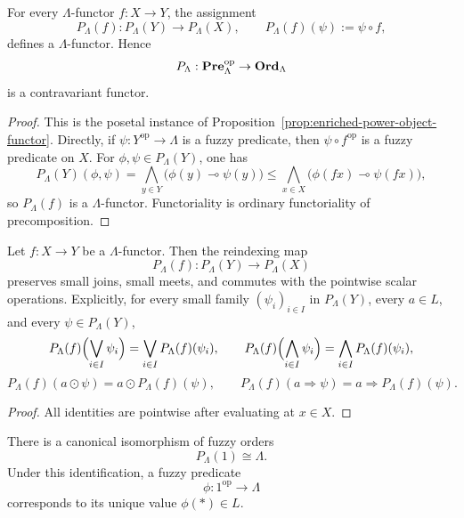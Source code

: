 \begin{proposition}
\label{prop:fuzzy-power-object-functor}
    For every \(\Lambda\)-functor \(f:X\to Y\), the assignment
    \[
        P_\Lambda(f):P_\Lambda(Y)\to P_\Lambda(X),
        \qquad
        P_\Lambda(f)(\psi):=\psi\circ f,
    \]
    defines a \(\Lambda\)-functor. Hence
    \[
        P_\Lambda:\mathbf{Pre}_\Lambda^{\mathrm{op}}\to \mathbf{Ord}_\Lambda
    \]
    is a contravariant functor.
\end{proposition}

\begin{proof}
    This is the posetal instance of Proposition~\ref{prop:enriched-power-object-functor}. Directly, if \(\psi:Y^{\mathrm{op}}\to\Lambda\) is a fuzzy predicate, then \(\psi\circ f^{\mathrm{op}}\) is a fuzzy predicate on \(X\). For \(\phi,\psi\in P_\Lambda(Y)\), one has
    \[
        P_\Lambda(Y)(\phi,\psi)
        =
        \bigwedge_{y\in Y}\bigl(\phi(y)\multimap \psi(y)\bigr)
        \leq
        \bigwedge_{x\in X}
        \bigl(\phi(fx)\multimap \psi(fx)\bigr),
    \]
    so \(P_\Lambda(f)\) is a \(\Lambda\)-functor. Functoriality is ordinary functoriality of precomposition.
\end{proof}

\begin{proposition}
\label{prop:reindexing-preserves-predicate-structure}
    Let \(f:X\to Y\) be a \(\Lambda\)-functor. Then the reindexing map
    \[
        P_\Lambda(f):P_\Lambda(Y)\to P_\Lambda(X)
    \]
    preserves small joins, small meets, and commutes with the pointwise scalar operations. Explicitly, for every small family \((\psi_i)_{i\in I}\) in \(P_\Lambda(Y)\), every \(a\in L\), and every \(\psi\in P_\Lambda(Y)\),
    \[
        P_\Lambda(f)\Bigl(\bigvee_{i\in I}\psi_i\Bigr)
        =
        \bigvee_{i\in I}P_\Lambda(f)(\psi_i),
        \qquad
        P_\Lambda(f)\Bigl(\bigwedge_{i\in I}\psi_i\Bigr)
        =
        \bigwedge_{i\in I}P_\Lambda(f)(\psi_i),
    \]
    \[
        P_\Lambda(f)(a\odot\psi)=a\odot P_\Lambda(f)(\psi),
        \qquad
        P_\Lambda(f)(a\Rightarrow\psi)=a\Rightarrow P_\Lambda(f)(\psi).
    \]
\end{proposition}

\begin{proof}
    All identities are pointwise after evaluating at \(x\in X\).
\end{proof}

\begin{proposition}
\label{prop:power-of-unit}
    There is a canonical isomorphism of fuzzy orders
    \[
        P_\Lambda(1)\cong \Lambda.
    \]
    Under this identification, a fuzzy predicate
    \[
        \phi:1^{\mathrm{op}}\to\Lambda
    \]
    corresponds to its unique value \(\phi(\ast)\in L\).
\end{proposition}

